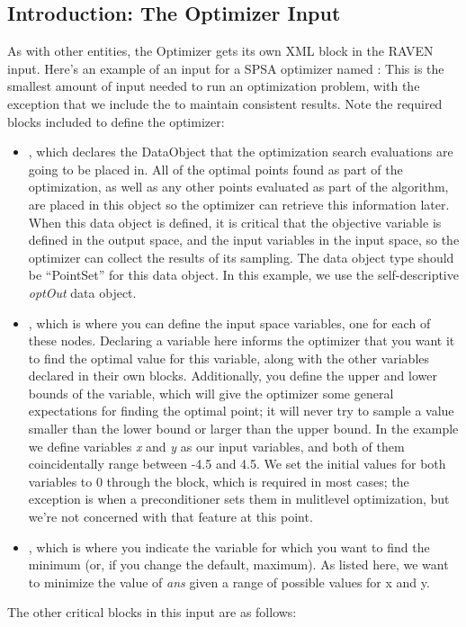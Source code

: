 \subsection{Introduction: The Optimizer Input}
As with other entities, the Optimizer gets its own XML block in the RAVEN input.
Here's an example of an input for a SPSA optimizer named :
This is the smallest amount of input needed to run an optimization problem, with the exception that we include
the  to maintain consistent results.  Note the required blocks included
to define the optimizer:
\begin{itemize}
  \item {}, which declares the DataObject that the optimization search evaluations are
    going to be placed in.  All of the optimal points found as part of the optimization, as well as any other
    points evaluated as part of the algorithm, are placed in this object so the optimizer can retrieve this
    information later.  When this data object is defined, it is critical that the objective variable is
    defined in the output space, and the input variables in the input space, so the optimizer can collect the
    results of its sampling.  The data object type should be ``PointSet'' for this data object.  In this
    example, we use the self-descriptive \emph{optOut} data object.
  \item {}, which is where you can define the input space variables, one for each of these
    nodes.  Declaring a variable here informs the optimizer that you want it to find the optimal value for
    this variable, along with the other variables declared in their own blocks.  Additionally, you define the
    upper and lower bounds of the variable, which will give the optimizer some general expectations for
    finding the optimal point; it will never try to sample a value smaller than the lower bound or larger than
    the upper bound.  In the example we define variables \emph{x} and \emph{y} as our input variables, and
    both of them coincidentally range between -4.5 and 4.5.  We set the initial values for both variables to 0
    through the  block, which is required in most cases; the exception is when a
    preconditioner sets them in mulitlevel optimization, but we're not concerned with that feature at this
    point.
  \item {}, which is where you indicate the variable for which you want to find the minimum (or,
    if you change the default, maximum).  As listed here, we want to minimize the value of \emph{ans} given a
    range of possible values for {x} and {y}.
\end{itemize}
The other critical blocks in this input are as follows:

